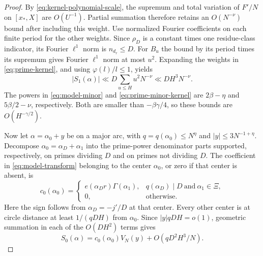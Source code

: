 \begin{proof}
By \eqref{eq:kernel-polynomial-scale}, the supremum and total variation of
$F'/N$ on $[x_*,X]$ are $O(U^{-1})$.  Partial summation therefore retains
an $O(N^{-\nu})$ bound after including this weight.  Use normalized
Fourier coefficients on each finite period for the other weights.  Since
$\rho_D$ is a constant times one residue-class indicator, its Fourier
$\ell^1$ norm is $n_{d_r}\le D$.  For $B_u$ the bound by its period times
its supremum gives Fourier $\ell^1$ norm at most $u^2$.  Expanding the
weights in \eqref{eq:prime-kernel}, and using $\varphi(l)/l\le1$, yields
\begin{equation}\label{eq:prime-minor-kernel}
 |S_1(\alpha)|\ll D\sum_{u\le H}u^2N^{-\nu}
 \ll DH^3N^{-\nu}.
\end{equation}
The powers in \eqref{eq:model-minor} and
\eqref{eq:prime-minor-kernel} are $2\beta-\eta$ and
$5\beta/2-\nu$, respectively.  Both are smaller than $-\beta\gamma/4$,
so these bounds are $O(H^{-\gamma/2})$.

Now let $\alpha=\alpha_0+y$ be on a major arc, with
$q=q(\alpha_0)\le N^\eta$ and $|y|\le3N^{-1+\eta}$.
Decompose $\alpha_0=\alpha_D+\alpha_1$ into the prime-power denominator
parts supported, respectively, on primes dividing $D$ and on primes not
dividing $D$.  The coefficient in \eqref{eq:model-transform} belonging
to the center $\alpha_0$, or zero if that center is absent, is
\begin{equation}\label{eq:model-local-coefficient}
 c_0(\alpha_0)=
 \begin{cases}
 e(\alpha_Dr)\Gamma(\alpha_1),
       &q(\alpha_D)\mid D\ \text{and}\ \alpha_1\in\Xi,\\
 0,&\text{otherwise}.
 \end{cases}
\end{equation}
Here the sign follows from $\alpha_D=-j'/D$ at that center.  Every other
center is at circle distance at least $1/(qDH)$ from $\alpha_0$.
Since $|y|qDH=o(1)$, geometric summation in each of the $O(DH^2)$ terms
gives
\begin{equation}\label{eq:model-major}
 S_0(\alpha)=c_0(\alpha_0)V_N(y)+O(qD^2H^3/N).
\end{equation}


\end{proof}
